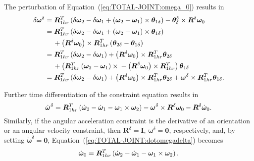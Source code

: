 \documentclass[10pt,dvips,fleqn,subeqn]{report}
\newcommand{\T}[1]{\bm{#1}}
\begin{document}
The perturbation of Equation~(\ref{eq:TOTAL-JOINT:omega_0}) results in
\begin{align}
	\delta\T{\omega}^{\delta}
	&= \T{R}_{1hr}^T \plbr{
		\delta\T{\omega}_2
		- \delta\T{\omega}_1
		+ \plbr{\T{\omega}_2 - \T{\omega}_1}\times\T{\theta}_{1\delta}
	} - \T{\theta}_{\delta}^{\delta}\times\T{R}^{\delta}\T{\omega}_0 \nonumber \\
	&= \T{R}_{1hr}^T \plbr{
		\delta\T{\omega}_2
		- \delta\T{\omega}_1
		+ \plbr{\T{\omega}_2 - \T{\omega}_1}\times\T{\theta}_{1\delta}
	} \nonumber \\
	& \mbox{\hspace{12pt}}
	+ \plbr{\T{R}^{\delta}\T{\omega}_0}\times \T{R}_{1hr}^T \plbr{
		\T{\theta}_{2\delta}
		- \T{\theta}_{1\delta}
	} \nonumber \\
	&= \T{R}_{1hr}^T \plbr{
		\delta\T{\omega}_2
		- \delta\T{\omega}_1
	} + \plbr{\T{R}^{\delta}\T{\omega}_0}\times \T{R}_{1hr}^T \T{\theta}_{2\delta}
	\nonumber \\
	& \mbox{\hspace{12pt}}
	+ \plbr{
		\T{R}_{1hr}^T \plbr{\T{\omega}_2 - \T{\omega}_1}\times{}
		- \plbr{\T{R}^{\delta}\T{\omega}_0}\times \T{R}_{1hr}^T
	} \T{\theta}_{1\delta}
	\nonumber \\
	&= \T{R}_{1hr}^T \plbr{
		\delta\T{\omega}_2
		- \delta\T{\omega}_1
	} + \plbr{\T{R}^{\delta}\T{\omega}_0}\times \T{R}_{1hr}^T \T{\theta}_{2\delta}
	+ \T{\omega}^{\delta} \times \T{R}_{1hr}^T \T{\theta}_{1\delta} .
\end{align}

Further time differentiation of the constraint equation results in
\begin{equation}
	\dot{\T{\omega}}^{\delta}
	= \T{R}_{1hr}^T\plbr{
		\dot{\T{\omega}}_2
		- \dot{\T{\omega}}_1
		- \T{\omega}_1 \times \T{\omega}_2
	} - \T{\omega}^{\delta} \times \T{R}^{\delta} \T{\omega}_0
	- \T{R}^{\delta} \dot{\T{\omega}}_0 .
	\label{eq:TOTAL-JOINT:dotomegadelta}
\end{equation}
Similarly, if the angular acceleration constraint 
is the derivative of an orientation or an angular velocity constraint,
then $\T{R}^{\delta}=\T{I}$, $\T{\omega}^{\delta}=\T{0}$, respectively,
and, by setting $\dot{\T{\omega}}^{\delta}=\T{0}$,
Equation~(\ref{eq:TOTAL-JOINT:dotomegadelta}) becomes
\begin{equation}
	\dot{\T{\omega}}_0 = \T{R}_{1hr}^T\plbr{
		\dot{\T{\omega}}_2
		- \dot{\T{\omega}}_1
		- \T{\omega}_1 \times \T{\omega}_2
	} .
\end{equation}
\end{document}
